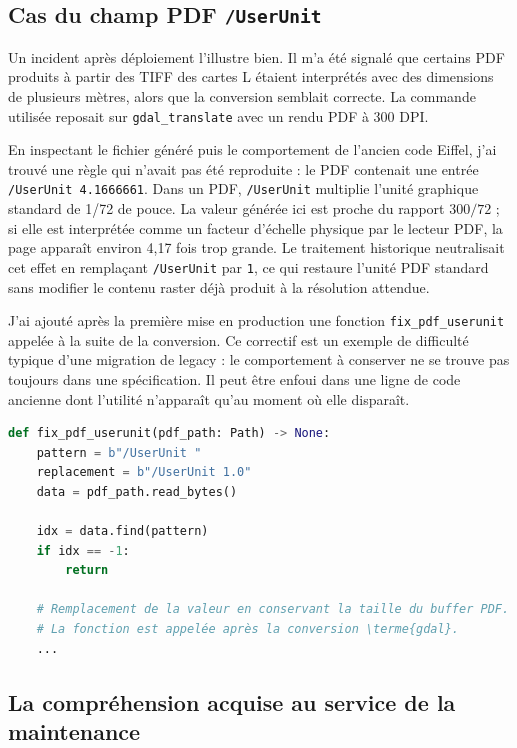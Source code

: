 \subsection{Cas du champ PDF \texttt{/UserUnit}}

Un incident après déploiement l'illustre bien. Il m'a été signalé que certains PDF produits à partir des TIFF des cartes L étaient interprétés avec des dimensions de plusieurs mètres, alors que la conversion semblait correcte. La commande utilisée reposait sur \texttt{gdal\_translate} avec un rendu PDF à 300 DPI.

En inspectant le fichier généré puis le comportement de l'ancien code Eiffel, j'ai trouvé une règle qui n'avait pas été reproduite : le PDF  contenait une entrée \texttt{/UserUnit 4.1666661}. Dans un PDF, \texttt{/UserUnit} multiplie l'unité graphique standard de 1/72 de pouce. La valeur générée ici est proche du rapport $300/72$ ; si elle est interprétée comme un facteur d'échelle physique par le lecteur PDF, la page apparaît environ 4,17 fois trop grande. Le traitement historique neutralisait cet effet en remplaçant \texttt{/UserUnit} par \texttt{1}, ce qui restaure l'unité PDF standard sans modifier le contenu raster déjà produit à la résolution attendue.

J'ai ajouté après la première mise en production une fonction \texttt{fix\_pdf\_userunit} appelée à la suite de la conversion. Ce correctif est un exemple de difficulté typique d'une migration de legacy : le comportement à conserver ne se trouve pas toujours dans une spécification. Il peut être enfoui dans une ligne de code ancienne dont l'utilité n'apparaît qu'au moment où elle disparaît.

\begin{lstlisting}[language=Python,caption={Principe du correctif appliqué aux PDF générés},label={lst:fcu-userunit}]
def fix_pdf_userunit(pdf_path: Path) -> None:
    pattern = b"/UserUnit "
    replacement = b"/UserUnit 1.0"
    data = pdf_path.read_bytes()

    idx = data.find(pattern)
    if idx == -1:
        return

    # Remplacement de la valeur en conservant la taille du buffer PDF.
    # La fonction est appelée après la conversion \terme{gdal}.
    ...
\end{lstlisting}

\subsection{La compréhension acquise au service de la maintenance}

